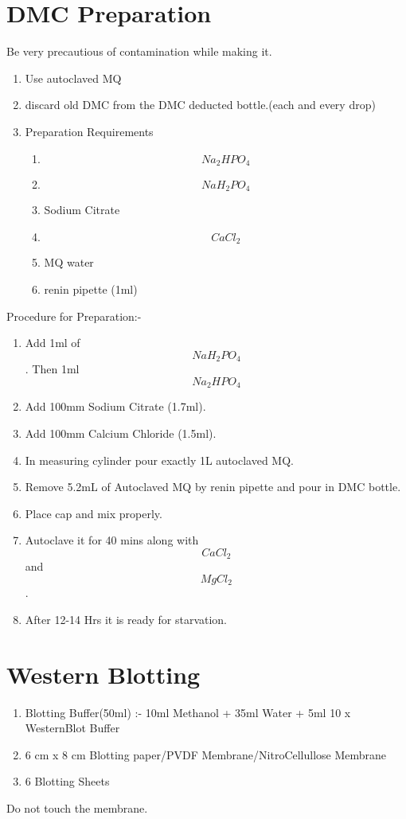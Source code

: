 \documentclass[11pt,twoside,a4paper]{article}
\begin{document}
\section{DMC Preparation}
Be very precautious of contamination while making it.
\begin{enumerate}
	\item Use autoclaved MQ
	\item discard old DMC from the DMC deducted bottle.(each and every drop)
	\item Preparation Requirements
		\begin{enumerate}
			\item \[ Na_2 HPO_4 \]
			\item \[ NaH_2PO_4\]
			\item Sodium Citrate
			\item \[ CaCl_2 \]
			\item MQ water
			\item renin pipette (1ml)
		\end{enumerate}
\end{enumerate}
Procedure for Preparation:-
\begin{enumerate}
	\item Add 1ml of \[ NaH_2PO_4 \]. Then 1ml \[ Na_2HPO_4 \]
	\item Add 100mm Sodium Citrate (1.7ml).
	\item Add 100mm Calcium Chloride (1.5ml).
	\item In measuring cylinder pour exactly 1L autoclaved MQ.
	\item Remove 5.2mL of Autoclaved MQ by renin pipette and pour in DMC bottle.
	\item Place cap and mix properly.
	\item Autoclave it for 40 mins along with \[ CaCl_2 \] and \[ MgCl_2 \].
	\item After 12-14 Hrs it is ready for starvation.
\end{enumerate}

\section{Western Blotting}
\begin{enumerate}
	\item Blotting Buffer(50ml) :- 10ml Methanol +  35ml Water + 5ml 10 x WesternBlot Buffer
	\item 6 cm x 8 cm Blotting paper/PVDF Membrane/NitroCellullose Membrane
	\item 6 Blotting Sheets
\end{enumerate}
Do not touch the membrane.
\end{document}
